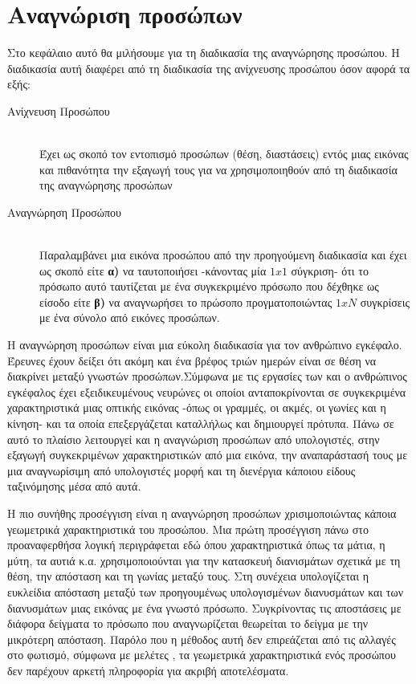 \chapter{Αναγνώριση προσώπων}\label{ch:facerec}

Στο κεφάλαιο αυτό θα μιλήσουμε για τη διαδικασία της αναγνώρησης προσώπου. Η
διαδικασία αυτή διαφέρει από τη διαδικασία της ανίχνευσης προσώπου όσον αφορά τα
εξής:

\begin{description}
  \item[Ανίχνευση Προσώπου] \hfill \\
    Έχει ως σκοπό τον εντοπισμό προσώπων (θέση, διαστάσεις) εντός μιας εικόνας
    και πιθανότητα την εξαγωγή τους για να χρησιμοποιηθούν από τη διαδικασία της
    αναγνώρησης προσώπων

  \item[Αναγνώρηση Προσώπου] \hfill \\
    Παραλαμβάνει μια εικόνα προσώπου από την προηγούμενη διαδικασία και έχει ως
    σκοπό είτε \textbf{α)} να ταυτοποιήσει -κάνοντας μία $1x1$ σύγκριση- ότι το
    πρόσωπο αυτό ταυτίζεται με ένα συγκεκριμένο πρόσωπο που δέχθηκε ως είσοδο
    είτε \textbf{β)} να αναγνωρήσει το πρώσοπο προγματοποιώντας $1xN$ συγκρίσεις
    με ένα σύνολο από εικόνες προσώπων.

\end{description}

Η αναγνώρηση προσώπων είναι μια εύκολη διαδικασία για τον ανθρώπινο εγκέφαλο.
Έρευνες \cite{} έχουν δείξει ότι ακόμη και ένα βρέφος τριών ημερών  είναι σε
θέση να διακρίνει μεταξύ γνωστών προσώπων.Σύμφωνα με τις
εργασίες των \cite{} και \cite{} ο ανθρώπινος εγκέφαλος έχει εξειδικευμένους
νευρώνες οι οποίοι ανταποκρίνονται σε συγκεκριμένα χαρακτηριστικά μιας οπτικής
εικόνας -όπως οι γραμμές, οι ακμές, οι γωνίες και η κίνηση- και τα οποία
επεξεργάζεται καταλλήλως και δημιουργεί πρότυπα. Πάνω σε αυτό το πλαίσιο λειτουργεί
και η αναγνώριση προσώπων από υπολογιστές, στην εξαγωγή συγκεκριμένων χαρακτηριστικών
από μια εικόνα, την αναπαράστασή τους με μια αναγνωρίσιμη από υπολογιστές μορφή
και τη διενέργια κάποιου είδους ταξινόμησης μέσα από αυτά.


Η πιο συνήθης προσέγγιση είναι η αναγνώρηση προσώπων χρισιμοποιώντας κάποια
γεωμετρικά χαρακτηριστικά του προσώπου. Μια πρώτη προσέγγιση πάνω στο προαναφερθήσα
λογική περιγράφεται εδώ \cite{} όπου χαρακτηριστικά όπως τα μάτια, η μύτη, τα
αυτιά κ.α. χρησιμοποιούνται για την κατασκευή διανισμάτων σχετικά με τη θέση,
την απόσταση και τη γωνίας μεταξύ τους. Στη συνέχεια υπολογίζεται η ευκλείδια
απόσταση μεταξύ των προηγουμένως υπολογισμένων διανυσμάτων και των διανυσμάτων
μιας εικόνας με ένα γνωστό πρόσωπο. Συγκρίνοντας τις αποστάσεις με διάφορα δείγματα
το πρόσωπο που αναγνωρίζεται θεωρείται το δείγμα με την μικρότερη απόσταση. Παρόλο
που η μέθοδος αυτή δεν επιρεάζεται από τις αλλαγές στο φωτισμό, σύμφωνα με
μελέτες \cite{}, τα γεωμετρικά χαρακτηριστικά ενός προσώπου δεν παρέχουν αρκετή πληροφορία
για ακριβή αποτελέσματα.

